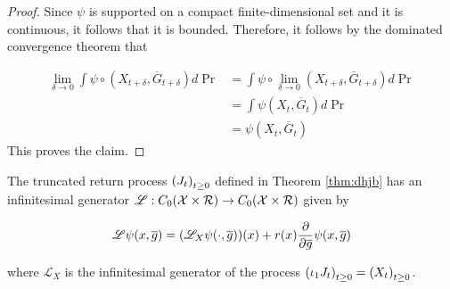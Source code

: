 \begin{proof}
  Since $\psi$ is supported on a compact finite-dimensional set and it
  is continuous, it follows that it is bounded. Therefore, it follows
  by the dominated convergence theorem that

  \begin{align*}
    \lim_{\delta\to 0}\int\psi\circ(X_{t+\delta},
    \overline{G}_{t+\delta})d\Pr &= \int\psi\circ\lim_{\delta\to
                                   0}(X_{t+\delta}, \overline{G}_{t+\delta})d\Pr\\
                                 &= \int\psi(X_t, \overline{G}_t)d\Pr\\
    &= \psi(X_t, \overline{G}_t)
  \end{align*}
  This proves the claim.
\end{proof}

\begin{corollary}\label{cor:generator}
  The truncated return process $\indexedabove{t}{J}$ defined in
  Theorem \ref{thm:dhjb} has an infinitesimal generator
  $\mathscr{L}:C_0(\mathcal{X}\times\returnspace)\to
  C_0(\mathcal{X}\times\returnspace)$
  given by

  \begin{equation}
    \label{eq:truncated-return:generator}
    \mathscr{L}\psi(x, \overline{g}) = (\mathscr{L}_X\psi(\cdot, \overline{g}))(x) +
    r(x)\partialderiv{}{\overline{g}}\psi(x, \overline{g})
  \end{equation}

  where $\mathscr{L}_X$ is the infinitesimal generator of the process
  $\indexedabove{t}{\proj{1}J} = \indexedabove{t}{X}$.
\end{corollary}
